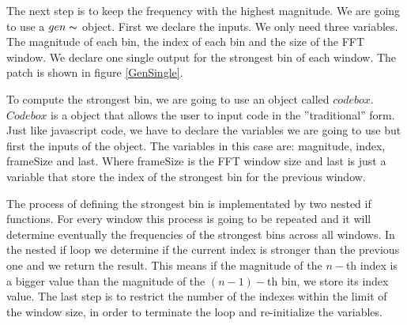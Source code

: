 The next step is to keep the frequency with the highest magnitude. We are going to use a $gen\thicksim$ object. First we declare the inputs. We only need three variables. The magnitude of each bin, the index of each bin and the size of the FFT window. We declare one single output for the strongest bin of each window. The patch is shown in figure \ref{GenSingle}.

To compute the strongest bin, we are going to use an object called $codebox$. $Codebox$ is a object that allows the user to input code in the ''traditional'' form. Just like javascript code, we have to declare the variables we are going to use but first the inputs of the object. The variables in this case are: magnitude, index, frameSize and last. Where frameSize is the FFT window size and last is just a variable that store the index of the strongest bin for the previous window.

The process of defining the strongest bin is implementated by two nested if functions. For every window this process is going to be repeated and it will determine eventually the frequencies of the strongest bins across all windows. In the nested if loop we determine if the current index is stronger than the previous one and we return the result. This means if the magnitude of the $n-$th index is a bigger value than the magnitude of the $(n-1)-$th bin, we store its index value. The last step is to restrict the number of the indexes within the limit of the window size, in order to terminate the loop and re-initialize the variables.

